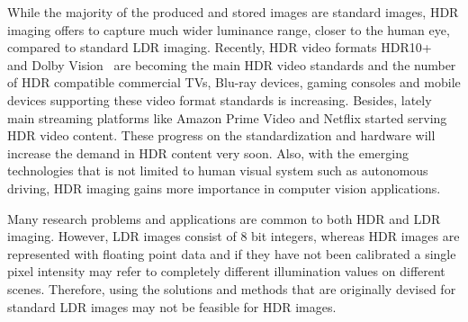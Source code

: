 While the majority of the produced and stored images are standard images, HDR imaging offers to capture much wider luminance range, closer to the human eye, compared to standard LDR imaging. Recently, HDR video formats HDR10+~\cite{HDR10+} and Dolby Vision~\cite{chinnock2016dolby} are becoming the main HDR video standards and the number of HDR compatible commercial TVs, Blu-ray devices, gaming consoles and mobile devices supporting these video format standards is increasing. Besides, lately main streaming platforms like Amazon Prime Video and Netflix started serving HDR video content. These progress on the standardization and hardware will increase the demand in HDR content very soon. Also, with the emerging technologies that is not limited to human visual system such as autonomous driving, HDR imaging gains more importance in computer vision applications.


Many research problems and applications are common to both HDR and LDR imaging. However, LDR images consist of 8 bit integers, whereas HDR images are represented with floating point data and if they have not been calibrated a single pixel intensity may refer to completely different illumination values on different scenes. Therefore, using the solutions and methods that are originally devised for standard LDR images may not be feasible for HDR images. 


